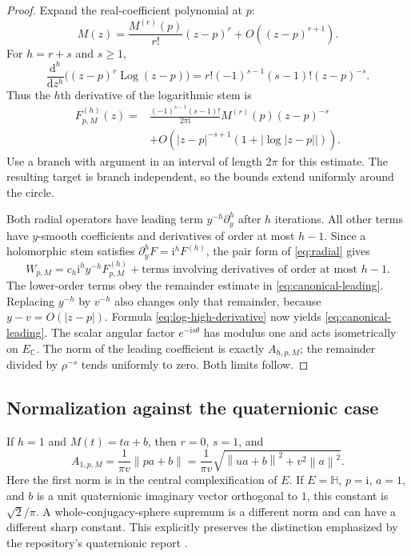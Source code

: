 \documentclass[11pt,a4paper]{article}
\numberwithin{equation}{section}
\theoremstyle{definition}
\theoremstyle{remark}
\newcommand{\C}{\mathbb C}
\newcommand{\HH}{\mathbb H}
\newcommand{\ii}{\mathrm i}
\newcommand{\norm}[1]{\left\lVert#1\right\rVert}
\begin{document}
\begin{proof}
Expand the real-coefficient polynomial at $p$:
\[
 M(z)=\frac{M^{(r)}(p)}{r!}(z-p)^r+O((z-p)^{r+1}).
\]
For $h=r+s$ and $s\ge1$,
\[
 \frac{\mathrm d^h}{\mathrm dz^h}\bigl((z-p)^r\operatorname{Log}(z-p)\bigr)
 =r!(-1)^{s-1}(s-1)!(z-p)^{-s}.
\]
Thus the $h$th derivative of the logarithmic stem is
\begin{equation}\label{eq:log-high-derivative}
\begin{split}
 F_{p,M}^{(h)}(z)={}&
 \frac{(-1)^{s-1}(s-1)!}{2\pi\ii}
 M^{(r)}(p)(z-p)^{-s}\\
 &+O\!\left(|z-p|^{-s+1}(1+|\log|z-p||)\right).
\end{split}
\end{equation}
Use a branch with argument in an interval of length $2\pi$ for this estimate.
The resulting target is branch independent, so the bounds extend uniformly
around the circle.

Both radial operators have leading term $y^{-h}\partial_y^h$ after $h$
iterations. All other terms have $y$-smooth coefficients and derivatives of
order at most $h-1$. Since a holomorphic stem satisfies
$\partial_y^hF=\ii^hF^{(h)}$, the pair form of \eqref{eq:radial} gives
\[
 W_{p,M}=c_h\ii^hy^{-h}F_{p,M}^{(h)}
   +\text{terms involving derivatives of order at most }h-1.
\]
The lower-order terms obey the remainder estimate in
\eqref{eq:canonical-leading}. Replacing $y^{-h}$ by $v^{-h}$ also changes
only that remainder, because $y-v=O(|z-p|)$. Formula
\eqref{eq:log-high-derivative} now yields \eqref{eq:canonical-leading}.
The scalar angular factor $e^{-\ii s\theta}$ has modulus one and acts
isometrically on $E_{\C}$. The norm of the leading coefficient is exactly
$A_{h,p,M}$; the remainder divided by $\rho^{-s}$ tends uniformly to zero.
Both limits follow.
\end{proof}

\subsection{Normalization against the quaternionic case}

If $h=1$ and $M(t)=ta+b$, then $r=0$, $s=1$, and
\[
 A_{1,p,M}=\frac1{\pi v}\norm{pa+b}
 =\frac1{\pi v}\sqrt{\norm{ua+b}^2+v^2\norm a^2}.
\]
Here the first norm is in the central complexification of $E$. If $E=\HH$,
$p=\ii$, $a=1$, and $b$ is a unit quaternionic imaginary vector orthogonal to
$1$, this constant is $\sqrt2/\pi$. A whole-conjugacy-sphere supremum is a
different norm and can have a different sharp constant. This explicitly
preserves the distinction emphasized by the repository's quaternionic report
\cite{repo}.
\end{document}
